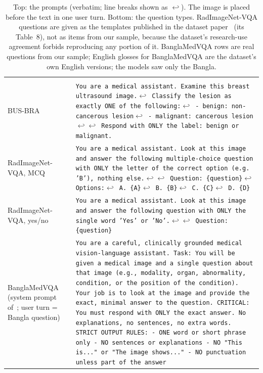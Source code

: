 \documentclass[doublecolumn]{ijcvsplatex}
\begin{document}
\begin{table}[tb]
\centering
\caption{Top: the prompts (verbatim; line breaks shown as $\hookleftarrow$). The image is placed before the text in one user turn. Bottom: the question types. RadImageNet-VQA questions are given as the templates published in the dataset paper~\cite{butsanets2025radimagenetvqa} (its Table~8), not as items from our sample, because the dataset's research-use agreement forbids reproducing any portion of it. BanglaMedVQA rows are real questions from our sample; English glosses for BanglaMedVQA are the dataset's own English versions; the models saw only the Bangla.}
\label{tab_prompts}
\footnotesize
\begin{tabular}{@{}>{\raggedright\arraybackslash}p{2.7cm}p{15.15cm}@{}}
\toprule
\multicolumn{2}{@{}l}{\textbf{Prompts}} \\
BUS-BRA & \texttt{You are a medical assistant. Examine this breast ultrasound image.$\hookleftarrow$ Classify the lesion as exactly ONE of the following:$\hookleftarrow$ - benign: non-cancerous lesion$\hookleftarrow$ - malignant: cancerous lesion$\hookleftarrow\hookleftarrow$ Respond with ONLY the label: benign or malignant.} \\
RadImageNet-VQA, MCQ & \texttt{You are a medical assistant. Look at this image and answer the following multiple-choice question with ONLY the letter of the correct option (e.g. 'B'), nothing else.$\hookleftarrow\hookleftarrow$ Question: \{question\}$\hookleftarrow$ Options:$\hookleftarrow$ A. \{A\}$\hookleftarrow$ B. \{B\}$\hookleftarrow$ C. \{C\}$\hookleftarrow$ D. \{D\}} \\
RadImageNet-VQA, yes/no & \texttt{You are a medical assistant. Look at this image and answer the following question with ONLY the single word 'Yes' or 'No'.$\hookleftarrow\hookleftarrow$ Question: \{question\}} \\
BanglaMedVQA \newline (system prompt of~\cite{ahmed2026banglamedvqa}; user turn = Bangla question) & \texttt{You are a careful, clinically grounded medical vision-language assistant. Task: You will be given a medical image and a single question about that image (e.g., modality, organ, abnormality, condition, or the position of the condition). Your job is to look at the image and provide the exact, minimal answer to the question. CRITICAL: You must respond with ONLY the exact answer. No explanations, no sentences, no extra words. STRICT OUTPUT RULES: - ONE word or short phrase only - NO sentences or explanations - NO "This is..." or "The image shows..." - NO punctuation unless part of the answer} \\

\end{tabular}
\end{table}
\end{document}
